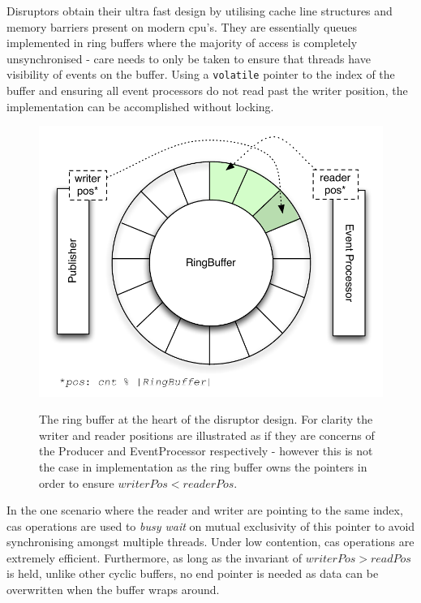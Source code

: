 \documentclass[a4paper,11pt]{scrreprt}
\begin{document}
Disruptors obtain their ultra fast design by utilising cache line structures and memory barriers present on modern \acrshort{cpu}'s. They are essentially queues implemented in ring buffers where the majority of access is completely unsynchronised - care needs to only be taken to ensure that threads have visibility of events on the buffer. Using a \texttt{volatile} pointer to the index of the buffer and ensuring all event processors do not read past the writer position, the implementation can be accomplished without locking. 
\begin{figure}[h]
\centering
\caption{The ring buffer at the heart of the disruptor design. For clarity the writer and reader positions are illustrated as if they are concerns of the Producer and EventProcessor respectively - however this is not the case in implementation as the ring buffer owns the pointers in order to ensure \(writerPos < readerPos\).}
\includegraphics[scale=0.65, trim=0 10 0 0, clip=true] {ringbuffer.pdf}
\label{fig:ringbuffer}
\end{figure}

In the one scenario where the reader and writer are pointing to the same index, \acrshort{cas} operations are used to \textit{busy wait} on mutual exclusivity of this pointer to avoid synchronising amongst multiple threads. Under low contention, \acrshort{cas} operations are extremely efficient. Furthermore, as long as the invariant of \(writerPos > readPos\) is held, unlike other cyclic buffers, no end pointer is needed as data can be overwritten when the buffer wraps around.
\end{document}
